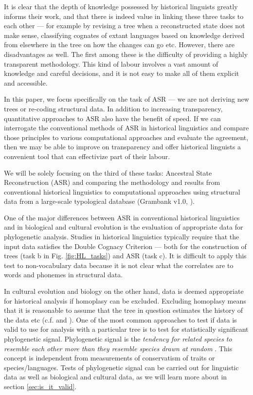 \documentclass[12pt,letterpaper]{article}
\begin{document}
It is clear that the depth of knowledge possessed by historical linguists greatly informs their work, and that there is indeed value in linking these three tasks to each other --- for example by revising a tree when a reconstructed state does not make sense, classifying cognates of extant languages based on knowledge derived from elsewhere in the tree on how the changes can go etc. However, there are disadvantages as well. The first among these is the difficulty of providing a highly transparent methodology. This kind of labour involves a vast amount of knowledge and careful decisions, and it is not easy to make all of them explicit and accessible. 

In this paper, we focus specifically on the task of ASR --- we are not deriving new trees or re-coding structural data. In addition to increasing transparency, quantitative approaches to ASR also have the benefit of speed. If we can interrogate the conventional methods of ASR in historical linguistics and compare those principles to various computational approaches and evaluate the agreement, then we may be able to improve on transparency and offer historical linguists a convenient tool that can effectivize part of their labour.

We will be solely focusing on the third of these tasks: Ancestral State Reconstruction (ASR) and comparing the methodology and results from conventional historical linguistics to computational approaches using structural data from a large-scale typological database (Grambank v1.0, \citet{grambank_release}). 

One of the major differences between ASR in conventional historical linguistics and in biological and cultural evolution is the evaluation of appropriate data for phylogenetic analysis. Studies in historical linguistics typically require that the input data satisfies the Double Cognacy Criterion \citep{walkden_2013} --- both for the construction of trees (task b in Fig. \ref{fig:HL_tasks}) and ASR (task c). It is difficult to apply this test to non-vocabulary data because it is not clear what the correlates are to words and phonemes in structural data. 

In cultural evolution and biology on the other hand, data is deemed appropriate for historical analysis if homoplasy can be excluded. Excluding homoplasy means that it is reasonable to assume that the tree in question estimates the history of the data etc (c.f. \citet{holland2020accuracy} and \citet{evans2021uses}). One of the most common approaches to test if data is valid to use for analysis with a particular tree is to test for statistically significant phylogenetic signal. Phylogenetic signal is the \emph{tendency for related species to resemble each other more than they resemble species drawn at random} \citep[905]{blomberg2002tempo}. This concept is independent from measurements of conservatism of traits or species/languages. Tests of phylogenetic signal can be carried out for linguistic data as well as biological and cultural data, as we will learn more about in section \ref{sec:is_it_valid}.
\end{document}
